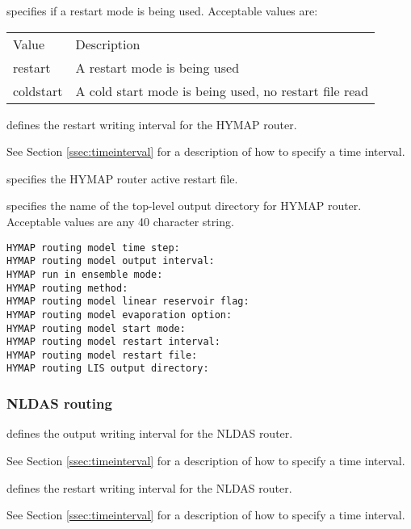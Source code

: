   specifies if a restart mode is
 being used. 
 Acceptable values are:

 \begin{tabular}{ll}
 Value     & Description                                           \\
 restart   & A restart mode is being used                          \\
 coldstart & A cold start mode is being used, no restart file read \\
 \end{tabular}

  defines the restart writing 
 interval for the HYMAP router.

 See Section \ref{ssec:timeinterval} for a description
 of how to specify a time interval.

  specifies the HYMAP router
 active restart file.

  specifies the name of the
 top-level output directory for HYMAP router.
 Acceptable values are any 40 character string.
 

 \begin{Verbatim}[frame=single]
HYMAP routing model time step:
HYMAP routing model output interval:
HYMAP run in ensemble mode:
HYMAP routing method:
HYMAP routing model linear reservoir flag:
HYMAP routing model evaporation option:
HYMAP routing model start mode:
HYMAP routing model restart interval:
HYMAP routing model restart file:
HYMAP routing LIS output directory:
 \end{Verbatim}

 
 \subsubsection{NLDAS routing} \label{sssec:nldasrouting}
 

 
  defines the output
 writing interval for the NLDAS router.

 See Section \ref{ssec:timeinterval} for a description
 of how to specify a time interval.

  defines the restart
 writing interval for the NLDAS router.

 See Section \ref{ssec:timeinterval} for a description
 of how to specify a time interval.

